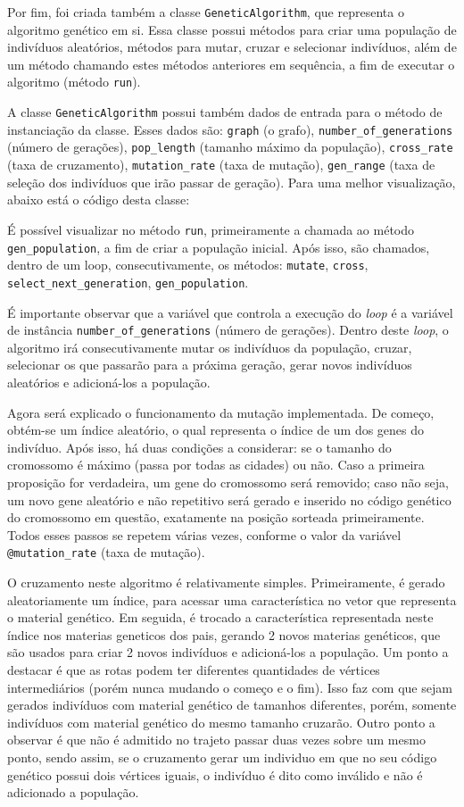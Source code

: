 Por fim, foi criada também a classe \texttt{GeneticAlgorithm}, que representa o algoritmo genético em si. Essa classe possui métodos para criar uma população de indivíduos aleatórios, métodos para mutar, cruzar e selecionar indivíduos, além de um método chamando estes métodos anteriores em sequência, a fim de executar o algoritmo (método \texttt{run}).


A classe \texttt{GeneticAlgorithm} possui também dados de entrada para o método de instanciação da classe. Esses dados são: \texttt{graph} (o grafo), \texttt{number\_of\_generations} (número de gerações), \texttt{pop\_length} (tamanho máximo da população), \texttt{cross\_rate} (taxa de cruzamento), \texttt{mutation\_rate} (taxa de mutação), \texttt{gen\_range} (taxa de seleção dos indivíduos que irão passar de geração).
Para uma melhor visualização, abaixo está o código desta classe:



É possível visualizar no método \texttt{run}, primeiramente a chamada ao método \texttt{gen\_population}, a fim de criar a população inicial. Após isso, são chamados, dentro de um loop, consecutivamente, os métodos: \texttt{mutate}, \texttt{cross}, \texttt{select\_next\_generation}, \texttt{gen\_population}.

É importante observar que a variável que controla a execução do \emph{loop} é a variável de instância \texttt{number\_of\_generations} (número de gerações). Dentro deste \emph{loop}, o algoritmo irá consecutivamente mutar os indivíduos da população, cruzar, selecionar os que passarão para a próxima geração, gerar novos indivíduos aleatórios e adicioná-los a população.

Agora será explicado o funcionamento da mutação implementada. De começo, obtém-se um índice aleatório, o qual representa o índice de um dos genes do indivíduo. Após isso, há duas condições a considerar: se o tamanho do cromossomo é máximo (passa por todas as cidades) ou não. Caso a primeira proposição for verdadeira, um gene do cromossomo será removido; caso não seja, um novo gene aleatório e não repetitivo será gerado e inserido no código genético do cromossomo em questão, exatamente na posição sorteada primeiramente. Todos esses passos se repetem várias vezes, conforme o valor da variável \texttt{@mutation\_rate} (taxa de mutação).

O cruzamento neste algoritmo é relativamente simples. Primeiramente, é gerado aleatoriamente um índice, para acessar uma característica no vetor que representa o material genético. Em seguida, é trocado a característica representada neste índice nos materias geneticos dos pais, gerando 2 novos materias genéticos, que são usados para criar 2 novos indivíduos e adicioná-los a população. Um ponto a destacar é que as rotas podem ter diferentes quantidades de vértices intermediários (porém nunca mudando o começo e o fim). Isso faz com que sejam gerados indivíduos com material genético de tamanhos diferentes, porém, somente indivíduos com material genético do mesmo tamanho cruzarão. 
Outro ponto a observar é que não é admitido no trajeto passar duas vezes sobre um mesmo ponto, sendo assim, se o cruzamento gerar um individuo em que no seu código genético possui dois vértices iguais, o indivíduo é dito como inválido e não é adicionado a população.
